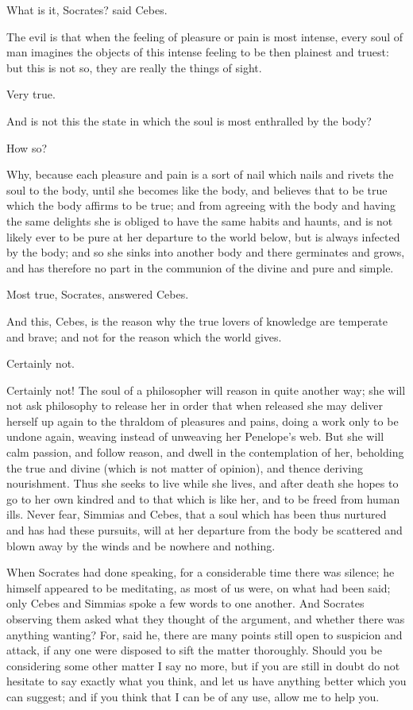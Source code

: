What is it, Socrates? said Cebes.

The evil is that when the feeling of pleasure or pain is most intense,
every soul of man imagines the objects of this intense feeling to be
then plainest and truest: but this is not so, they are really the things
of sight.

Very true.

And is not this the state in which the soul is most enthralled by the
body?

How so?

Why, because each pleasure and pain is a sort of nail which nails
and rivets the soul to the body, until she becomes like the body, and
believes that to be true which the body affirms to be true; and from
agreeing with the body and having the same delights she is obliged to
have the same habits and haunts, and is not likely ever to be pure at
her departure to the world below, but is always infected by the body;
and so she sinks into another body and there germinates and grows,
and has therefore no part in the communion of the divine and pure and
simple.

Most true, Socrates, answered Cebes.

And this, Cebes, is the reason why the true lovers of knowledge are
temperate and brave; and not for the reason which the world gives.

Certainly not.

Certainly not! The soul of a philosopher will reason in quite another
way; she will not ask philosophy to release her in order that when
released she may deliver herself up again to the thraldom of pleasures
and pains, doing a work only to be undone again, weaving instead of
unweaving her Penelope's web. But she will calm passion, and follow
reason, and dwell in the contemplation of her, beholding the true
and divine (which is not matter of opinion), and thence deriving
nourishment. Thus she seeks to live while she lives, and after death she
hopes to go to her own kindred and to that which is like her, and to be
freed from human ills. Never fear, Simmias and Cebes, that a soul which
has been thus nurtured and has had these pursuits, will at her departure
from the body be scattered and blown away by the winds and be nowhere
and nothing.

When Socrates had done speaking, for a considerable time there was
silence; he himself appeared to be meditating, as most of us were, on
what had been said; only Cebes and Simmias spoke a few words to one
another. And Socrates observing them asked what they thought of the
argument, and whether there was anything wanting? For, said he, there
are many points still open to suspicion and attack, if any one were
disposed to sift the matter thoroughly. Should you be considering
some other matter I say no more, but if you are still in doubt do not
hesitate to say exactly what you think, and let us have anything better
which you can suggest; and if you think that I can be of any use, allow
me to help you.


